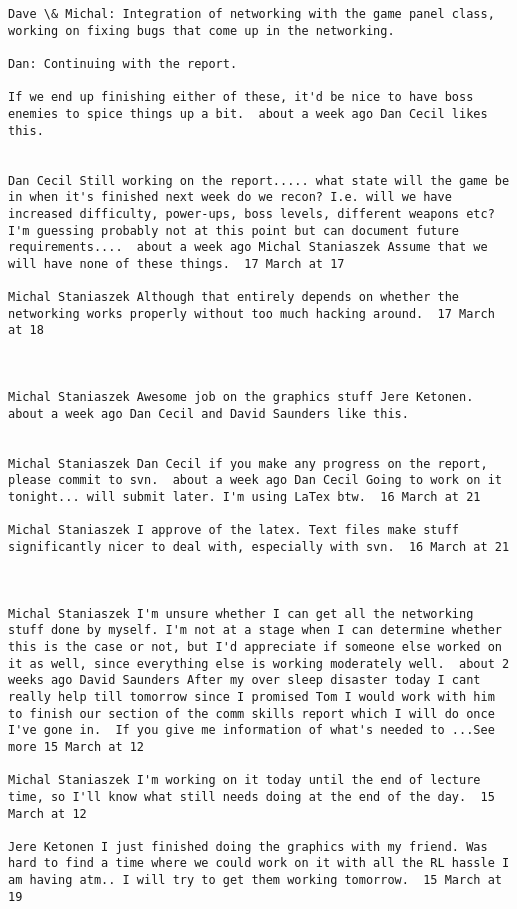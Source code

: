 \begin{verbatim}
Dave \& Michal: Integration of networking with the game panel class,
working on fixing bugs that come up in the networking.

Dan: Continuing with the report.

If we end up finishing either of these, it'd be nice to have boss
enemies to spice things up a bit.  about a week ago Dan Cecil likes
this.


Dan Cecil Still working on the report..... what state will the game be
in when it's finished next week do we recon? I.e. will we have
increased difficulty, power-ups, boss levels, different weapons etc?
I'm guessing probably not at this point but can document future
requirements....  about a week ago Michal Staniaszek Assume that we
will have none of these things.  17 March at 17

Michal Staniaszek Although that entirely depends on whether the
networking works properly without too much hacking around.  17 March
at 18



Michal Staniaszek Awesome job on the graphics stuff Jere Ketonen.
about a week ago Dan Cecil and David Saunders like this.


Michal Staniaszek Dan Cecil if you make any progress on the report,
please commit to svn.  about a week ago Dan Cecil Going to work on it
tonight... will submit later. I'm using LaTex btw.  16 March at 21

Michal Staniaszek I approve of the latex. Text files make stuff
significantly nicer to deal with, especially with svn.  16 March at 21



Michal Staniaszek I'm unsure whether I can get all the networking
stuff done by myself. I'm not at a stage when I can determine whether
this is the case or not, but I'd appreciate if someone else worked on
it as well, since everything else is working moderately well.  about 2
weeks ago David Saunders After my over sleep disaster today I cant
really help till tomorrow since I promised Tom I would work with him
to finish our section of the comm skills report which I will do once
I've gone in.  If you give me information of what's needed to ...See
more 15 March at 12

Michal Staniaszek I'm working on it today until the end of lecture
time, so I'll know what still needs doing at the end of the day.  15
March at 12

Jere Ketonen I just finished doing the graphics with my friend. Was
hard to find a time where we could work on it with all the RL hassle I
am having atm.. I will try to get them working tomorrow.  15 March at
19




\end{verbatim}
